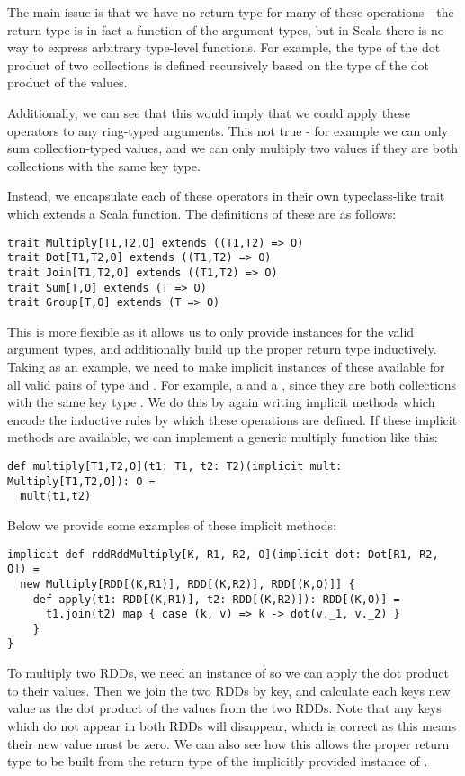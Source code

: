 The main issue is that we have no return type for many of these operations - the return type is in fact a function of the argument types, but in Scala there is no way to express arbitrary type-level functions. For example, the  type of the dot product of two collections is defined recursively based on the type of the dot product of the values.

Additionally, we can see that this would imply that we could apply these operators to any ring-typed arguments. This not true - for example we can only sum collection-typed values, and we can only multiply two values if they are both collections with the same key type. 

Instead, we encapsulate each of these operators in their own typeclass-like trait which extends a Scala function. The definitions of these are as follows:
\vs\begin{lstlisting}
trait Multiply[T1,T2,O] extends ((T1,T2) => O)
trait Dot[T1,T2,O] extends ((T1,T2) => O)
trait Join[T1,T2,O] extends ((T1,T2) => O)
trait Sum[T,O] extends (T => O)
trait Group[T,O] extends (T => O)
\end{lstlisting}\vs
This is more flexible as it allows us to only provide instances for the valid argument types, and additionally build up the proper return type inductively.
Taking  as an example, we need to make implicit instances of these available for all valid pairs of type  and . For example, a  and a , since they are both collections with the same key type . We do this by again writing implicit methods which encode the inductive rules by which these operations are defined. If these implicit methods are available, we can implement a generic multiply function like this:
\vs\begin{lstlisting}
def multiply[T1,T2,O](t1: T1, t2: T2)(implicit mult: Multiply[T1,T2,O]): O =
  mult(t1,t2)
\end{lstlisting}\vs
Below we provide some examples of these implicit methods:
\vs\begin{lstlisting}
implicit def rddRddMultiply[K, R1, R2, O](implicit dot: Dot[R1, R2, O]) =
  new Multiply[RDD[(K,R1)], RDD[(K,R2)], RDD[(K,O)]] {
    def apply(t1: RDD[(K,R1)], t2: RDD[(K,R2)]): RDD[(K,O)] = 
      t1.join(t2) map { case (k, v) => k -> dot(v._1, v._2) }
    }
}
\end{lstlisting}\vs
To multiply two RDDs, we need an instance of  so we can apply the dot product to their values. Then we join the two RDDs by key, and calculate each keys new value as the dot product of the values from the two RDDs. Note that any keys which do not appear in both RDDs will disappear, which is correct as this means their new value must be zero. We can also see how this allows the proper return type to be built from the return type  of the implicitly provided instance of .
